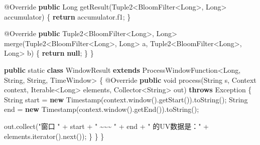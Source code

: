 \documentclass[cn,11pt,chinese]{elegantbook}
\newenvironment{Shaded}{}{}
\newcommand{\AttributeTok}[1]{\textcolor[rgb]{0.49,0.56,0.16}{#1}}
\newcommand{\BuiltInTok}[1]{#1}
\newcommand{\DataTypeTok}[1]{\textcolor[rgb]{0.56,0.13,0.00}{#1}}
\newcommand{\FunctionTok}[1]{\textcolor[rgb]{0.02,0.16,0.49}{#1}}
\newcommand{\KeywordTok}[1]{\textcolor[rgb]{0.00,0.44,0.13}{\textbf{#1}}}
\newcommand{\NormalTok}[1]{#1}
\newcommand{\StringTok}[1]{\textcolor[rgb]{0.25,0.44,0.63}{#1}}
\begin{document}
\begin{Shaded}
\begin{Highlighting}[]
        \AttributeTok{@Override}
        \KeywordTok{public} \BuiltInTok{Long} \FunctionTok{getResult}\NormalTok{(Tuple2\textless{}BloomFilter\textless{}}\BuiltInTok{Long}\NormalTok{\textgreater{}, }\BuiltInTok{Long}\NormalTok{\textgreater{} accumulator) \{}
            \KeywordTok{return}\NormalTok{ accumulator.}\FunctionTok{f1}\NormalTok{;}
\NormalTok{        \}}

        \AttributeTok{@Override}
        \KeywordTok{public}\NormalTok{ Tuple2\textless{}BloomFilter\textless{}}\BuiltInTok{Long}\NormalTok{\textgreater{}, }\BuiltInTok{Long}\NormalTok{\textgreater{} }\FunctionTok{merge}\NormalTok{(Tuple2\textless{}BloomFilter\textless{}}\BuiltInTok{Long}\NormalTok{\textgreater{}, }\BuiltInTok{Long}\NormalTok{\textgreater{} a, Tuple2\textless{}BloomFilter\textless{}}\BuiltInTok{Long}\NormalTok{\textgreater{}, }\BuiltInTok{Long}\NormalTok{\textgreater{} b) \{}
            \KeywordTok{return} \KeywordTok{null}\NormalTok{;}
\NormalTok{        \}}
\NormalTok{    \}}

    \KeywordTok{public} \DataTypeTok{static} \KeywordTok{class}\NormalTok{ WindowResult }\KeywordTok{extends}\NormalTok{ ProcessWindowFunction\textless{}}\BuiltInTok{Long}\NormalTok{, }\BuiltInTok{String}\NormalTok{, }\BuiltInTok{String}\NormalTok{, TimeWindow\textgreater{} \{}
        \AttributeTok{@Override}
        \KeywordTok{public} \DataTypeTok{void} \FunctionTok{process}\NormalTok{(}\BuiltInTok{String}\NormalTok{ s, }\BuiltInTok{Context}\NormalTok{ context, }\BuiltInTok{Iterable}\NormalTok{\textless{}}\BuiltInTok{Long}\NormalTok{\textgreater{} elements, Collector\textless{}}\BuiltInTok{String}\NormalTok{\textgreater{} out) }\KeywordTok{throws} \BuiltInTok{Exception}\NormalTok{ \{}
            \BuiltInTok{String}\NormalTok{ start = }\KeywordTok{new} \BuiltInTok{Timestamp}\NormalTok{(context.}\FunctionTok{window}\NormalTok{().}\FunctionTok{getStart}\NormalTok{()).}\FunctionTok{toString}\NormalTok{();}
            \BuiltInTok{String}\NormalTok{ end = }\KeywordTok{new} \BuiltInTok{Timestamp}\NormalTok{(context.}\FunctionTok{window}\NormalTok{().}\FunctionTok{getEnd}\NormalTok{()).}\FunctionTok{toString}\NormalTok{();}

\NormalTok{            out.}\FunctionTok{collect}\NormalTok{(}\StringTok{"窗口 "}\NormalTok{ + start + }\StringTok{" \textasciitilde{}\textasciitilde{}\textasciitilde{} "}\NormalTok{ + end + }\StringTok{" 的UV数据是："}\NormalTok{ + elements.}\FunctionTok{iterator}\NormalTok{().}\FunctionTok{next}\NormalTok{());}
\NormalTok{        \}}
\NormalTok{    \}}
\NormalTok{\}}
\end{Highlighting}
\end{Shaded}
\end{document}
